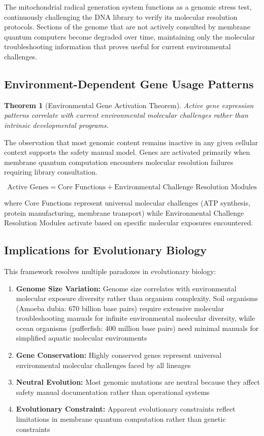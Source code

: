\documentclass[12pt,a4paper]{article}
\newtheorem{theorem}{Theorem}
\begin{document}
The mitochondrial radical generation system functions as a genomic stress test, continuously challenging the DNA library to verify its molecular resolution protocols. Sections of the genome that are not actively consulted by membrane quantum computers become degraded over time, maintaining only the molecular troubleshooting information that proves useful for current environmental challenges.

\subsection{Environment-Dependent Gene Usage Patterns}

\begin{theorem}[Environmental Gene Activation Theorem]
Active gene expression patterns correlate with current environmental molecular challenges rather than intrinsic developmental programs.
\end{theorem}

The observation that most genomic content remains inactive in any given cellular context supports the safety manual model. Genes are activated primarily when membrane quantum computation encounters molecular resolution failures requiring library consultation.

\begin{equation}
\text{Active Genes} = \text{Core Functions} + \text{Environmental Challenge Resolution Modules}
\end{equation}

where Core Functions represent universal molecular challenges (ATP synthesis, protein manufacturing, membrane transport) while Environmental Challenge Resolution Modules activate based on specific molecular exposures encountered.

\subsection{Implications for Evolutionary Biology}

This framework resolves multiple paradoxes in evolutionary biology:

\begin{enumerate}
\item \textbf{Genome Size Variation:} Genome size correlates with environmental molecular exposure diversity rather than organism complexity. Soil organisms (Amoeba dubia: 670 billion base pairs) require extensive molecular troubleshooting manuals for infinite environmental molecular diversity, while ocean organisms (pufferfish: 400 million base pairs) need minimal manuals for simplified aquatic molecular environments
\item \textbf{Gene Conservation:} Highly conserved genes represent universal environmental molecular challenges faced by all lineages
\item \textbf{Neutral Evolution:} Most genomic mutations are neutral because they affect safety manual documentation rather than operational systems
\item \textbf{Evolutionary Constraint:} Apparent evolutionary constraints reflect limitations in membrane quantum computation rather than genetic constraints
\end{enumerate}
\end{document}
